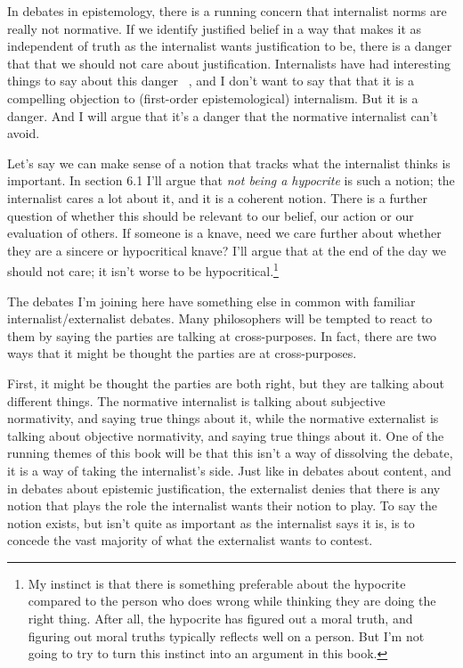 In debates in epistemology, there is a running concern that internalist norms are really not normative. If we identify justified belief in a way that makes it as independent of truth as the internalist wants justification to be, there is a danger that that we should not care about justification. Internalists have had interesting things to say about this danger ~\citep{Conee1992}, and I don't want to say that that it is a compelling objection to (first-order epistemological) internalism. But it is a danger. And I will argue that it's a danger that the normative internalist can't avoid.

Let's say we can make sense of a notion that tracks what the internalist thinks is important. In section 6.1 I'll argue that \emph{not being a hypocrite} is such a notion; the internalist cares a lot about it, and it is a coherent notion. There is a further question of whether this should be relevant to our belief, our action or our evaluation of others. If someone is a knave, need we care further about whether they are a sincere or hypocritical knave? I'll argue that at the end of the day we should not care; it isn't worse to be hypocritical.\footnote{My instinct is that there is something preferable about the hypocrite compared to the person who does wrong while thinking they are doing the right thing. After all, the hypocrite has figured out a moral truth, and figuring out moral truths typically reflects well on a person. But I'm not going to try to turn this instinct into an argument in this book.}

The debates I'm joining here have something else in common with familiar internalist\slash externalist debates. Many philosophers will be tempted to react to them by saying the parties are talking at cross-purposes. In fact, there are two ways that it might be thought the parties are at cross-purposes.

First, it might be thought the parties are both right, but they are talking about different things. The normative internalist is talking about subjective normativity, and saying true things about it, while the normative externalist is talking about objective normativity, and saying true things about it. One of the running themes of this book will be that this isn't a way of dissolving the debate, it is a way of taking the internalist's side. Just like in debates about content, and in debates about epistemic justification, the externalist denies that there is any notion that plays the role the internalist wants their notion to play. To say the notion exists, but isn't quite as important as the internalist says it is, is to concede the vast majority of what the externalist wants to contest.

